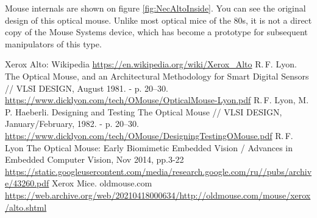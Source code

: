 \documentclass[11pt, a4paper]{article}
\begin{document}
Mouse internals are shown on figure \ref{fig:NecAltoInside}. You can see the original design of this optical mouse. Unlike most optical mice of the 80s, it is not a direct copy of the Mouse Systems device, which has become a prototype for subsequent manipulators of this type.

\begin{thebibliography}{9}
 Xerox Alto: Wikipedia \url{https://en.wikipedia.org/wiki/Xerox_Alto}
 R.\,F. Lyon. The Optical Mouse, and an Architectural Methodology for
Smart Digital Sensors // VLSI DESIGN, August 1981. - p. 20--30. \url{https://www.dicklyon.com/tech/OMouse/OpticalMouse-Lyon.pdf}
 R.\,F. Lyon, M.\,P. Haeberli. Designing and Testing The Optical Mouse // VLSI DESIGN, January/February, 1982. - p. 20--30. \url{https://www.dicklyon.com/tech/OMouse/DesigningTestingOMouse.pdf}
 R.\,F. Lyon The Optical Mouse: Early Biomimetic Embedded Vision / Advances in Embedded Computer Vision, Nov 2014, pp.3-22 \url{https://static.googleusercontent.com/media/research.google.com/ru//pubs/archive/43260.pdf}
 Xerox Mice. oldmouse.com \url{https://web.archive.org/web/20210418000634/http://oldmouse.com/mouse/xerox/alto.shtml}
\end{thebibliography}
\end{document}

